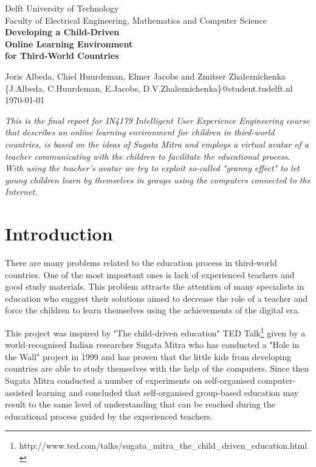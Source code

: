 \documentclass[a4paper]{article}
\begin{document}
\begin{titlepage}

\begin{center}

Delft University of Technology\\
Faculty of Electrical Engineering, Mathematics and Computer Science\\[3cm]
\huge \bf{Developing a Child-Driven \\ Online Learning Environment \\ for Third-World Countries}\\[15cm]
\end{center}

\large \noindent 
Joris Albeda, Chiel Huurdeman, Elmer Jacobs and Zmitser Zhaleznichenka\\
\{J.Albeda, C.Huurdeman, E.Jacobs, D.V.Zhaleznichenka\}@student.tudelft.nl\\

\noindent\today

\end{titlepage}

\setcounter{secnumdepth}{3}

\abstract \emph{This is the final report for IN4179 Intelligent User Experience Engineering course that describes an online learning environment for children in third-world countries, is based on the ideas of Sugata Mitra and employs a virtual avatar of a teacher communicating with the children to facilitate the educational process. With using the teacher's avatar we try to exploit so-called "granny effect" to let young children learn by themselves in groups using the computers connected to the Internet.}

\section{Introduction}

There are many problems related to the education process in third-world countries. One of the most important ones is lack of experienced teachers and good study materials. This problem attracts the attention of many specialists in education who suggest their solutions aimed to decrease the role of a teacher and force the children to learn themselves using the achievements of the digital era.

This project was inspired by "The child-driven education" TED Talk\footnote{http://www.ted.com/talks/sugata\_mitra\_the\_child\_driven\_education.html} given by a world-recognised Indian researcher Sugata Mitra who has conducted a "Hole in the Wall" project in 1999 and has proven that the little kids from developing countries are able to study themselves with the help of the computers. Since then Sugata Mitra conducted a number of experiments on self-organised computer-assisted learning and concluded that self-organised group-based education may result to the same level of understanding that can be reached during the educational process guided by the experienced teachers. 
\end{document}
